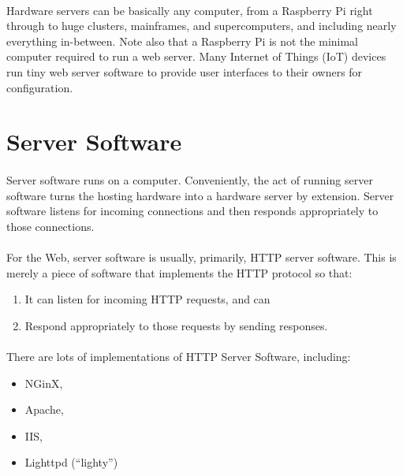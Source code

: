 \paragraph{} Hardware servers can be basically any computer, from a Raspberry Pi right through to huge clusters, mainframes, and supercomputers, and including nearly everything in-between. Note also that a Raspberry Pi is not the minimal computer required to run a web server. Many Internet of Things (IoT) devices run tiny web server software to provide user interfaces to their owners for configuration.


\section{Server Software}
\paragraph{} Server software runs on a computer. Conveniently, the act of running server software turns the hosting hardware into a hardware server by extension. Server software listens for incoming connections and then responds appropriately to those connections.
\paragraph{} For the Web, server software is usually, primarily, HTTP server software. This is merely a piece of software that implements the HTTP protocol so that:

\begin{enumerate}
\item It can listen for incoming HTTP requests, and can
\item Respond appropriately to those requests by sending responses.
\end{enumerate}

\paragraph{} There are lots of implementations of HTTP Server Software, including:

\begin{itemize}
\item NGinX, 
\item Apache, 
\item IIS, 
\item Lighttpd (``lighty'')
\end{itemize}

